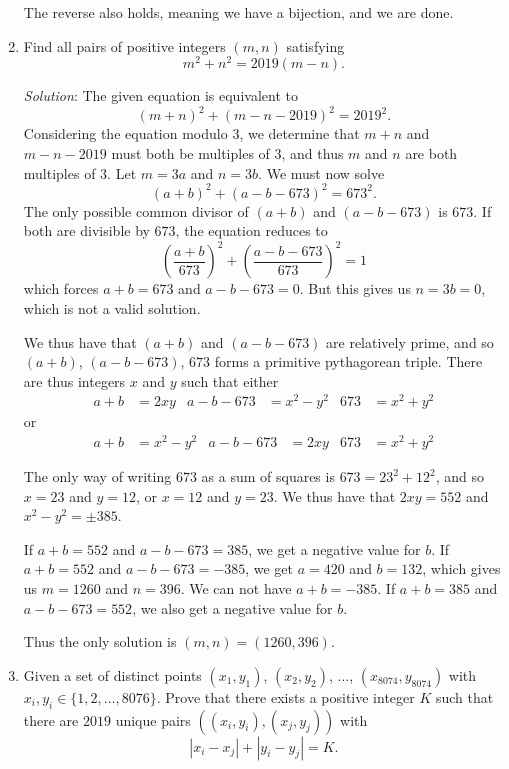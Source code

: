 \documentclass{article}
\begin{document}
\begin{enumerate}[1.]
  The reverse also holds, meaning we have a bijection, and we are done.
  
\vfill

\item %
Find all pairs of positive integers $(m,n)$ satisfying
\[ m^2 +n^2 = 2019(m-n). \]

\textit{Solution}:
The given equation is equivalent to
\[
	(m + n)^2 + (m - n - 2019)^2 = 2019^2.
\]
Considering the equation modulo $3$, we determine that $m + n$ and $m - n - 2019$ must both be multiples of $3$, and thus $m$ and $n$ are both multiples of $3$. Let $m = 3a$ and $n = 3b$. We must now solve
\[
	(a + b)^2 + (a - b - 673)^2 = 673^2.
\]
The only possible common divisor of $(a + b)$ and $(a - b - 673)$ is $673$. If both are divisible by $673$, the equation reduces to
\[
	\left(\frac{a + b}{673}\right)^2 + \left(\frac{a - b - 673}{673}\right)^2 = 1
\]
which forces $a + b = 673$ and $a - b - 673 = 0$. But this gives us $n = 3b = 0$, which is not a valid solution.

We thus have that $(a + b)$ and $(a - b - 673)$ are relatively prime, and so $(a + b)$, $(a - b - 673)$, $673$ forms a primitive pythagorean triple. There are thus integers $x$ and $y$ such that either
\begin{align*}
	a + b & = 2xy & a - b - 673 & = x^2 - y^2 & 673 & = x^2 + y^2
\end{align*}
or
\begin{align*}
	a + b & = x^2 - y^2 & a - b - 673 & = 2xy & 673 & = x^2 + y^2
\end{align*}

The only way of writing $673$ as a sum of squares is $673 = 23^2 + 12^2$, and so $x = 23$ and $y = 12$, or $x = 12$ and $y = 23$. We thus have that $2xy = 552$ and $x^2 - y^2 = \pm 385$.

If $a + b = 552$ and $a - b - 673 = 385$, we get a negative value for $b$.
If $a + b = 552$ and $a - b - 673 = -385$, we get $a = 420$ and $b = 132$, which gives us $m = 1260$ and $n = 396$.
We can not have $a + b = -385$.
If $a + b = 385$ and $a - b - 673 = 552$, we also get a negative value for $b$.

Thus the only solution is $(m, n) = (1260, 396)$.

\vfill

\item %
Given a set of distinct points $(x_1, y_1)$, $(x_2, y_2)$, $\dots$, $(x_{8074}, y_{8074})$ with $x_i, y_i \in \{1, 2, \dots, 8076\}$.
Prove that there exists a positive integer $K$ such that there are $2019$ unique pairs $( (x_i, y_i), (x_j, y_j) )$ with
\[ |x_i - x_j| + |y_i - y_j| = K. \]


\end{enumerate}
\end{document}
